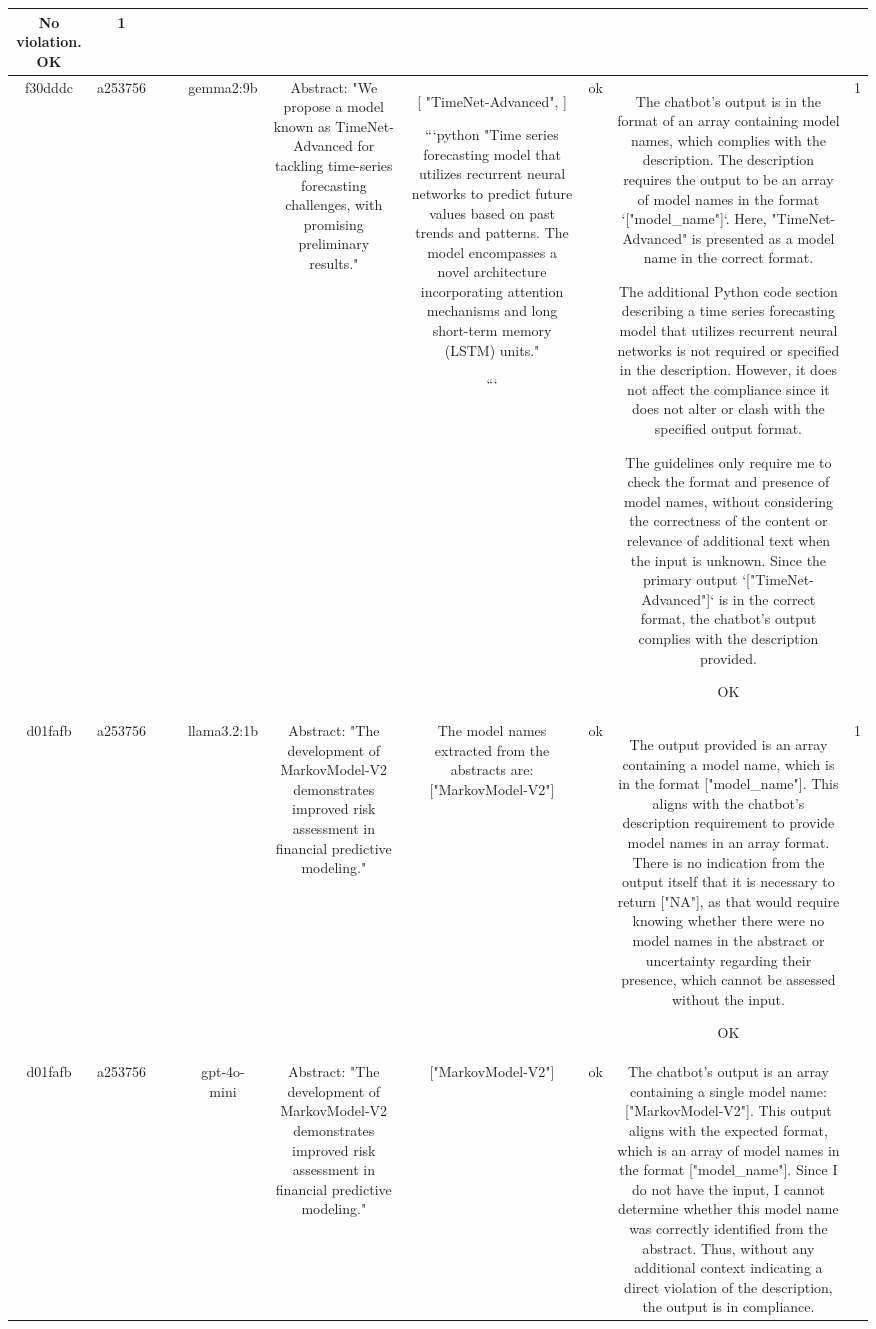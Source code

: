 \begin{table}[h!]
\begin{tabular}{|c|c|c|c|c|c|c|c|c|c|}
No violation.
OK & 1\\
\hline
f30dddc & a253756 &  &  & gemma2:9b & Abstract: "We propose a model known as TimeNet-Advanced for tackling time-series forecasting challenges, with promising preliminary results." & [
"TimeNet-Advanced", 
]   


```python
"Time series forecasting model that utilizes recurrent neural networks to predict future values based on past trends and patterns. The model  encompasses a novel architecture incorporating attention mechanisms and long short-term memory (LSTM) units."



``` & ok & The chatbot's output is in the format of an array containing model names, which complies with the description. The description requires the output to be an array of model names in the format `["model_name"]`. Here, "TimeNet-Advanced" is presented as a model name in the correct format.

The additional Python code section describing a time series forecasting model that utilizes recurrent neural networks is not required or specified in the description. However, it does not affect the compliance since it does not alter or clash with the specified output format.

The guidelines only require me to check the format and presence of model names, without considering the correctness of the content or relevance of additional text when the input is unknown. Since the primary output `["TimeNet-Advanced"]` is in the correct format, the chatbot's output complies with the description provided.

OK & 1\\
\hline
d01fafb & a253756 &  &  & llama3.2:1b & Abstract: "The development of MarkovModel-V2 demonstrates improved risk assessment in financial predictive modeling." & The model names extracted from the abstracts are: 
["MarkovModel-V2"] & ok & The output provided is an array containing a model name, which is in the format ["model_name"]. This aligns with the chatbot's description requirement to provide model names in an array format. There is no indication from the output itself that it is necessary to return ["NA"], as that would require knowing whether there were no model names in the abstract or uncertainty regarding their presence, which cannot be assessed without the input.

OK & 1\\
\hline
d01fafb & a253756 &  &  & gpt-4o-mini & Abstract: "The development of MarkovModel-V2 demonstrates improved risk assessment in financial predictive modeling." & ["MarkovModel-V2"] & ok & The chatbot's output is an array containing a single model name: ["MarkovModel-V2"]. This output aligns with the expected format, which is an array of model names in the format ["model_name"]. Since I do not have the input, I cannot determine whether this model name was correctly identified from the abstract. Thus, without any additional context indicating a direct violation of the description, the output is in compliance.


\end{tabular}
\end{table}
